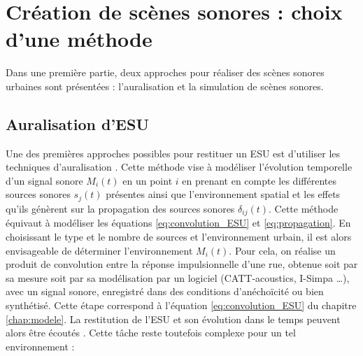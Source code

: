 \section{Création de scènes sonores : choix d'une méthode}

Dans une première partie, deux approches pour réaliser des scènes sonores urbaines sont présentées : l'auralisation et la simulation de scènes sonores.

\subsection{Auralisation d'ESU}

Une des premières approches possibles pour restituer un ESU est d'utiliser les techniques d'auralisation \cite{forssen2009auralization}. Cette méthode vise à modéliser l'évolution temporelle d'un signal sonore $M_i(t)$ en un point $i$ en prenant en compte les différentes sources sonores $s_j(t)$ présentes ainsi que l'environnement spatial et les effets qu'ils génèrent sur la propagation des sources sonores $\delta_{ij}(t)$. Cette méthode équivaut à modéliser les équations \ref{eq:convolution_ESU} et \ref{eq:propagation}. En choisissant le type et le nombre de sources et l'environnement urbain, il est alors envisageable de déterminer l'environnement $M_i(t)$.
Pour cela, on réalise un produit de convolution entre la réponse impulsionnelle d'une rue, obtenue soit par sa mesure soit par sa modélisation par un logiciel (CATT-acoustics, I-Simpa \dots), avec un signal sonore, enregistré dans des conditions d'anéchoïcité ou bien synthétisé. Cette étape correspond à l'équation \ref{eq:convolution_ESU} du chapitre \ref{chap:modele}. La restitution de l'ESU et son évolution dans le temps peuvent alors être écoutés \cite{vorlander2007auralization}. Cette tâche reste toutefois complexe pour un tel environnement :

